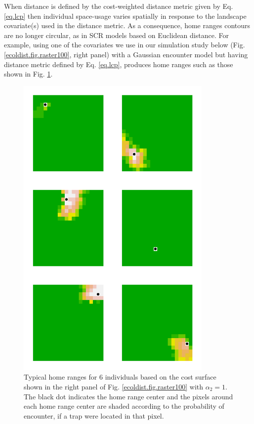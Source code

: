When distance is defined by the cost-weighted distance metric given
by Eq. \ref{eq.lcp} then individual space-usage varies
spatially in response to the landscape covariate(s) used in the
distance metric.  As a consequence, home ranges contours are no longer
circular, as in SCR models based on Euclidean distance.
 For example, using one of the covariates we use in
our simulation study below (Fig. \ref{ecoldist.fig.raster100}, right
panel) with a Gaussian
encounter model
but having distance
metric defined by Eq. \ref{eq.lcp}, produces home ranges such
as those shown in Fig. \ref{fig.homeranges}.


\begin{figure}
\begin{center}
\includegraphics[height=6in,width=3.75in]{Ch12-EcolDist/figs/home_ranges}
\end{center}
\caption{
Typical home ranges for 6 individuals based on the cost surface shown in the right panel of
  Fig. \ref{ecoldist.fig.raster100} with $\alpha_{2}=1$. The black dot indicates the home
  range center and the pixels around each home range center are shaded
according to the probability of encounter, if a trap were located in
that pixel.
}
\label{fig.homeranges}
\end{figure}

